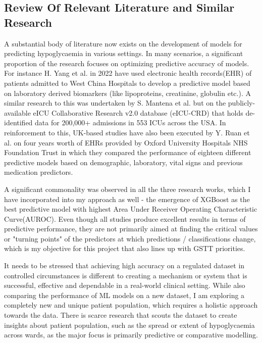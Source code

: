 \subsection{Review Of Relevant Literature and Similar Research}

\noindent A substantial body of literature now exists on the development of models for predicting hypoglycaemia in various settings. In many scenarios, a significant proportion of the research focuses on optimizing predictive accuracy of models. For instance H. Yang et al. in 2022 \cite{yangHaoJMIRMedicalInformatics} have used electronic health records(EHR) of patients admitted to West China Hospitals to develop a predictive model based on laboratory derived biomarkers (like lipoproteins, creatinine, globulin etc.).  A similar research to this was undertaken by S. Mantena et al. \cite{sMantenaCriticallyIll}  but on the publicly-available eICU Collaborative Research v2.0 database (eICU-CRD) that holds de-identified data for 200,000+ admissions in 553 ICUs across the USA. In reinforcement to this, UK-based studies have also been executed by Y. Ruan et al. \cite{yRuanOxfordHypoRiskPred} on four years worth of EHRs provided by Oxford University Hospitals NHS Foundation Trust in which they compared the performance of eighteen different predictive models based on demographic, laboratory, vital signs and previous medication predictors.  

\vspace{5pt}
\noindent A significant commonality was observed in all the three research works, which I have incorporated into my approach as well - the emergence of XGBoost as the best predictive model with highest Area Under Receiver Operating Characteristic Curve(AUROC). Even though all studies produce excellent results in terms of predictive performance, they are not primarily aimed at finding the critical values or "turning points" of the predictors at which predictions / classifications change, which is my objective for this project that also lines up with GSTT priorities.

\vspace{5pt}
\noindent It needs to be stressed that achieving high accuracy on a regulated dataset in controlled circumstances is different to creating a mechanism or system that is successful, effective and dependable in a real-world clinical setting. While also comparing the performance of ML models on a new dataset, I am exploring a completely new and unique patient population, which requires a holistic approach towards the data. There is scarce research that scouts the dataset to create insights about patient population, such as the spread or extent of hypoglycaemia across wards, as the major focus is primarily predictive or comparative modelling. 

